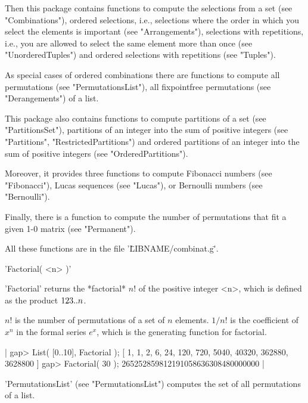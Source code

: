 Then this package contains functions to compute the selections from a set
(see "Combinations"),  ordered selections, i.e.,   selections where   the
order in which you select the elements is important (see "Arrangements"),
selections with repetitions,  i.e., you  are allowed to   select the same
element more than once  (see  "UnorderedTuples") and  ordered  selections
with repetitions (see "Tuples").

As special  cases of ordered  combinations there are functions to compute
all permutations (see "PermutationsList"),  all fixpointfree permutations
(see "Derangements") of a list.

This package also contains functions to  compute partitions of a set (see
"PartitionsSet"), partitions of  an integer  into   the sum of   positive
integers      (see    "Partitions",  "RestrictedPartitions") and  ordered
partitions of  an  integer  into   the  sum  of positive integers    (see
"OrderedPartitions").

Moreover,  it provides three  functions to compute Fibonacci numbers (see
"Fibonacci"), Lucas sequences  (see  "Lucas"), or Bernoulli  numbers (see
"Bernoulli").

Finally, there  is a function to  compute the number of permutations that
fit a given 1-0 matrix (see "Permanent").

All these functions are in the file '\"LIBNAME/combinat.g\"'.


'Factorial( <n> )'

'Factorial'  returns the *factorial*  $n!$  of the positive  integer <n>,
which is defined as the product $1 \* 2 \* 3 \* .. \* n$.

$n!$ is the  number of permutations of a set of $n$ elements.  $1/n!$  is
the coefficient  of  $x^n$  in  the  formal series  $e^x$, which  is  the
generating function for factorial.

|    gap> List( [0..10], Factorial );
    [ 1, 1, 2, 6, 24, 120, 720, 5040, 40320, 362880, 3628800 ]
    gap> Factorial( 30 );
    265252859812191058636308480000000 |

'PermutationsList'  (see   "PermutationsList") computes  the  set  of all
permutations of a list.

%

